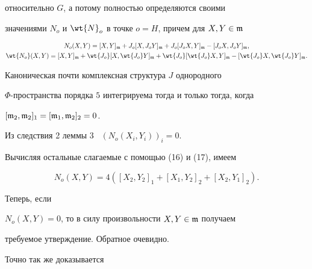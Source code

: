 относительно $G$, а потому полностью определяются своими


значениями $N_o$ и $ \wt{N}_o$ в точке $o=H$, причем для $X,Y


\in \frak{m}$


\begin{gather*}


N_o(X,Y)=[X,Y]_{\frak{m}}+J_o[X,J_oY]_{\frak{m}}+J_o[J_oX,Y]_{\frak{m}}-


[J_oX,J_oY]_{\frak{m}}, \\


%


\wt{N_o}(X,Y)=[X,Y]_{\frak{m}}+\wt{J_o}[X,\wt{J_o}Y]_{\frak{m}}+


\wt{J_o}[\wt{J_o}X,Y]_{\frak{m}}- [\wt{J_o}X,\wt{J_o}Y]_{\frak{m}}.


\end{gather*}





\begin{thm}


Каноническая почти комплексная структура $J$ однородного


$\Phi$-пространства порядка $5$ интегрируема тогда и только тогда, когда


$[\frak{m}_2,\frak{m}_2]_1=[\frak{m}_1,\frak{m}_2]_2=0$.


\end{thm}





\begin{pf}


Из следствия 2 леммы 3 \ $(N_o(X_i,Y_i))_i=0$.


Вычисляя остальные слагаемые с помощью (16) и (17), имеем


$$


N_o(X,Y)=4([X_2,Y_2]_1+[X_1,Y_2]_2+[X_2,Y_1]_2).


$$


Теперь, если


$N_o(X,Y)=0$, то в силу произвольности $X,Y\in \frak{m}$ получаем


требуемое утверждение. Обратное очевидно.


\end{pf}





Точно так же доказывается





